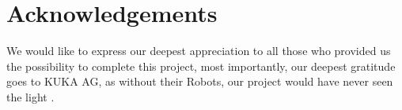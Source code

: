 
\chapter*{Acknowledgements}
%
%
%
%
%
%
%
%
%
%
%
We would like to express our deepest appreciation to all those who provided us the possibility to complete this project, most importantly, our deepest gratitude goes to KUKA AG, as without their Robots, our project would have never seen the light .  

